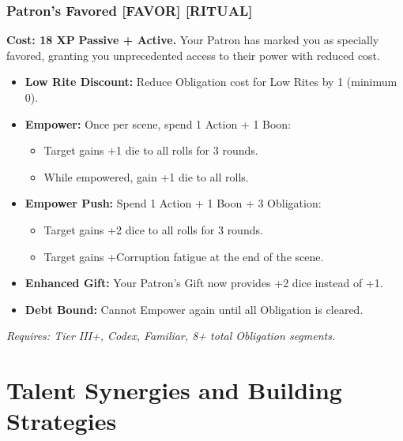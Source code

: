 \documentclass[12pt,a4paper]{book}
\begin{document}
\subsubsection*{Patron's Favored \textnormal{[FAVOR] [RITUAL]}}
\label{talent:patrons-favored}
\textbf{Cost: 18 XP} \textbf{Passive + Active.} Your Patron has marked you as specially favored, granting you unprecedented access to their power with reduced cost.
\begin{itemize}
\item \textbf{Low Rite Discount:} Reduce Obligation cost for Low Rites by 1 (minimum 0).
\item \textbf{Empower:} Once per scene, spend 1 Action + 1 Boon:
  \begin{itemize}
  \item Target gains +1 die to all rolls for 3 rounds.
  \item While empowered, gain +1 die to all rolls.
  \end{itemize}
\item \textbf{Empower Push:} Spend 1 Action + 1 Boon + 3 Obligation:
  \begin{itemize}
  \item Target gains +2 dice to all rolls for 3 rounds.
  \item Target gains +Corruption fatigue at the end of the scene.
  \end{itemize}
\item \textbf{Enhanced Gift:} Your Patron's Gift now provides +2 dice instead of +1.
\item \textbf{Debt Bound:} Cannot Empower again until all Obligation is cleared.
\end{itemize}
\textit{Requires: Tier III+, Codex, Familiar, 8+ total Obligation segments.}

\section{Talent Synergies and Building Strategies}
\label{sec:talent-synergies}
\end{document}
